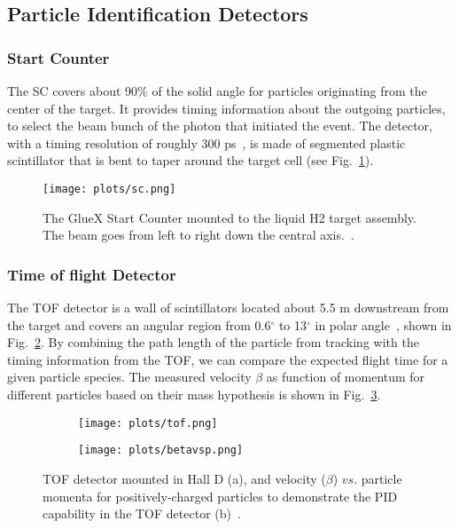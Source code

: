 \subsection{Particle Identification Detectors}
\label{p.2.2.1}

\subsubsection{Start Counter}
The SC covers about 90$\%$ of the solid angle for particles originating from the center of the target. It provides timing information about the outgoing particles, to select the beam bunch of the photon that initiated the event. The detector, with a timing resolution of roughly 300 ps~\cite{31}, is made of segmented plastic scintillator that is bent to taper around the target cell (see Fig.~\ref{fig.2.2.1.1}).

\begin{figure}[H]
    \centering
        \texttt{[image: plots/sc.png]}
        \caption{The GlueX Start Counter mounted to the liquid H2 target assembly. The beam goes from left to right down the central axis.~\cite{31}.}
        \label{fig.2.2.1.1}
\end{figure}

\subsubsection{Time of flight Detector}
The TOF detector is a wall of scintillators located about 5.5 m downstream from the target and covers an angular region from 0.6$^{\circ}$ to 13$^{\circ}$ in polar angle~\cite{31}, shown in Fig.~\ref{fig.2.2.1.2.a}. By combining the path length of the particle from tracking with the timing information from the TOF, we can compare the expected flight time for a given particle species. The measured velocity $\beta$ as function of momentum for different particles based on their mass hypothesis is shown in Fig.~\ref{fig.2.2.1.2.b}.

\begin{figure}[H]
    \centering
    \begin{subfigure}[H]{0.5\textwidth}
        \texttt{[image: plots/tof.png]}
        \caption{}
        \label{fig.2.2.1.2.a}
    \end{subfigure}\vfill
    \begin{subfigure}[H]{0.6\textwidth}
        \texttt{[image: plots/betavsp.png]}
        \caption{}
        \label{fig.2.2.1.2.b}
        \vspace{1pt}
    \end{subfigure}
    \caption{TOF detector mounted in Hall D (a), and velocity ($\beta$) $vs.$ particle momenta for positively-charged particles to demonstrate the PID capability in the TOF detector (b)~\cite{33}.}
    \label{fig.4.2.2}
\end{figure}

